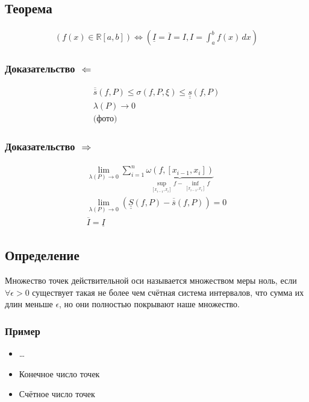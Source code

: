 \documentclass{article}
\begin{document}
\subsection{Теорема}
\begin{gather*}
    \left( f(x) \in \mathbb{R}[a, b] \right) \Leftrightarrow 
    \left( \underline{I} = \overline{I} = I, I = \int_{a}^{b} f(x)\,dx \right)
\end{gather*}

\subsubsection{Доказательство $\Leftarrow$}
\begin{gather*}
    \overline{\overline{s}} \left(f, P\right) \le \sigma \left(f, P, \xi\right) \le \underline{\underline{s}} \left(f, P\right) \\
    \lambda(P) \to 0 \\
    \text{(фото)}
\end{gather*}

\subsubsection{Доказательство $\Rightarrow$}
\begin{gather*}
    \lim_{\lambda(P) \to 0} \sum_{i=1}^{n} 
    \underbrace{\omega\left(f, [x_{i-1}, x_i]\right)}_{\underset{[x_{i-1}, x_i]}{\sup} f - \underset{{[x_{i-1}, x_i]}}{\inf} f} \\
    \lim_{\lambda(P) \to 0} \left(\underline{\underline{S}}\left(f, P\right) - 
    \overline{\overline{s}}\left(f, P\right)\right) = 0 \\
    \overline{I} = \underline{I}
\end{gather*}


\subsection{Определение}
Множество точек действительной оси называется множеством меры ноль, 
если $\forall \epsilon > 0$ существует такая не более чем счётная система интервалов, 
что сумма их длин меньше $\epsilon$, но они полностью покрывают наше множество.


\subsubsection{Пример}
\begin{itemize}
    \item \dots
    \item Конечное число точек 
    \item Счётное число точек
\end{itemize}
\end{document}
